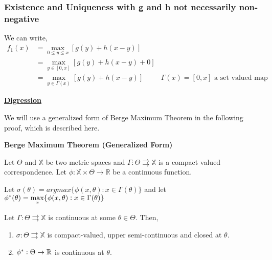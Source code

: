 \subsubsection*{Existence and Uniqueness with g and h not necessarily non-negative}
We can write, 
\begin{align*}
    f_1(x) &= \max_{0 \le y \le x} [g(y) + h(x-y)] \\
            &= \max_{y \in [0, x]} [g(y) + h(x-y) + 0] \\
            &= \max_{y \in \Gamma(x)} [g(y) + h(x-y)] & \Gamma(x) = [0, x] \text { a set valued map}
\end{align*}

\begin{tcolorbox}
    \begin{center}
        \textbf{\underline{Digression}}
    \end{center}

    We will use a generalized form of Berge Maximum Theorem in the following proof, which is described here.

    \textbf{Berge Maximum Theorem (Generalized Form)}

    Let $\Theta$ and $\mathbb{X}$ be two metric spaces and $\Gamma: \Theta \rightrightarrows \mathbb{X}$ is a compact valued correspondence. Let $\phi: \mathbb{X} \times \Theta \rightarrow \mathbb{R}$ be a continuous function.

    Let $\sigma(\theta) = argmax\{\phi(x, \theta): x \in \Gamma(\theta)\}$ and let $\phi^*(\theta) = \mathlarger{\max}_x\{\phi(x, \theta): x \in \Gamma(\theta)\}$

    \vspace{3mm}
    Let $\Gamma: \Theta \rightrightarrows \mathbb{X}$ is continuous at some $\theta \in \Theta$. Then,
    \begin{enumerate}
        \item $\sigma: \Theta \rightrightarrows \mathbb{X}$ is compact-valued, upper semi-continuous and closed at $\theta$.
        \item $\phi^*: \Theta \rightarrow \mathbb{R}$ is continuous at $\theta$.
    \end{enumerate}


\end{tcolorbox}

